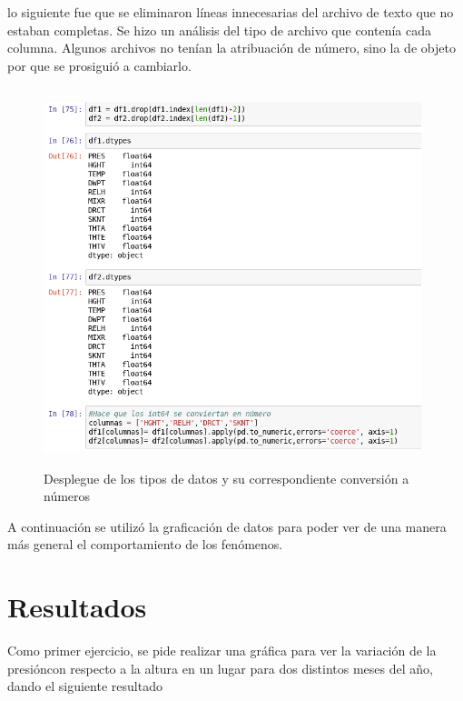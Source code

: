 \documentclass{article}
\begin{document}
lo siguiente fue que se eliminaron líneas innecesarias del archivo de texto que no estaban completas.
Se hizo un análisis del tipo de archivo que contenía cada columna. Algunos archivos no tenían la atribuación de número, sino la de objeto por que se prosiguió a cambiarlo.

\newpage

\begin{figure}[h!]
  \includegraphics[width=11cm, height=11cm]{objyconv.png}
  \caption{Desplegue de los tipos de datos y su correspondiente conversión a números}
  \label{fig: rap. de vientos y ráfagas}
\end{figure}

A continuación se utilizó la graficación de datos para poder ver de una manera más general el comportamiento de los fenómenos.


\section{Resultados}

Como primer ejercicio, se pide realizar una gráfica para ver la variación de la presióncon respecto a la altura en un lugar para dos distintos meses del año, dando el siguiente resultado

\newpage
\end{document}
